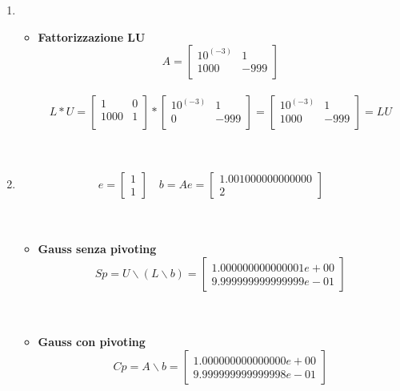 \begin{enumerate}
	\item 
	\begin{itemize}
		\item \textbf{Fattorizzazione LU}
			\[
			A =\begin{bmatrix}
				10^{(-3)} &   1  \\
	 			1000   & -999 \\
			\end{bmatrix}
			\]\\
			\[
			L*U =\begin{bmatrix}
				1    & 0 \\
				1000 & 1 \\
			\end{bmatrix} *
			\begin{bmatrix}
				10^{(-3)} & 1    \\
				0      	  & -999 \\
			\end{bmatrix} 
			= \begin{bmatrix}
				10^{(-3)} &   1  \\
				1000   & -999 \\
			\end{bmatrix} = LU
			\]\\\
	\end{itemize}
	\item
		\[
		e = \begin{bmatrix}
			1 \\
			1
		\end{bmatrix} \quad 
		b = Ae =\begin{bmatrix}
			1.001000000000000 \\
			2                 
		\end{bmatrix}
		\]\\\
	\begin{itemize}
	\item \textbf{Gauss senza pivoting}
		\[
		Sp = U \backslash (L \backslash b) = \begin{bmatrix}
			1.000000000000001e+00 \\
    		9.999999999999999e-01
		\end{bmatrix}
		\]\\\
	\end{itemize}
	\begin{itemize}
	\item \textbf{Gauss con pivoting}
		\[
		Cp = A \backslash b =\begin{bmatrix}
			1.000000000000000e+00 \\
    		9.999999999999998e-01 
		\end{bmatrix}
		\]
	\end{itemize}
\end{enumerate}